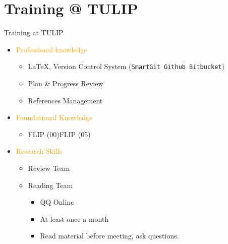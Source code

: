 \documentclass[
 size=14pt,
 paper=smartboard,  %
 mode=present, 		%
 display=slides, 	%
 style=tuliplab,  	%
 pauseslide,
 fleqn,leqno]{powerdot}
\newcommand{\draftnote}[3]{
	\todo[author=#2,color=#1!30,size=\footnotesize]{\textsf{#3}}	}
\newcommand{\gangli}[1]{\draftnote{blue}{GLi:}{#1}}
\begin{document}
\section{Training @ TULIP}


\begin{slide}{Training at TULIP}
\begin{itemize}
  \item \textcolor{orange}{Professional knowledge}
    \begin{itemize}
          \item \LaTeX{},
                Version Control System (\texttt{SmartGit Github Bitbucket})
          \item Plan \& Progress Review
          \item References Management
        \end{itemize}
  \item \textcolor{orange}{Foundational Knowledge}
    \begin{itemize}
      \item FLIP (00)\texttildelow FLIP (05)
    \end{itemize}
  \item \textcolor{orange}{Research Skills}
    \begin{itemize}
      \item Review Team
      \item Reading Team
        \begin{itemize}
          \item QQ Online
          \item At least once a month
          \item Read material before meeting,
                ask questions.
        \end{itemize}
    \end{itemize}
\end{itemize}
\end{slide}
\end{document}
